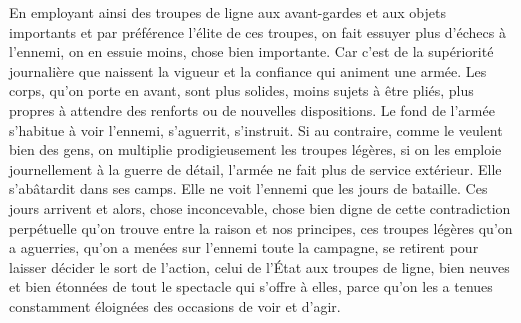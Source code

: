 \documentclass[french,twoside]{book} %
\begin{document}
En employant ainsi des troupes de ligne aux avant-gardes et aux objets importants et par préférence l’élite de ces troupes, on fait essuyer plus d’échecs à l’ennemi, on en essuie moins, chose bien importante. Car c’est de la supériorité journalière que naissent la vigueur et la confiance qui animent une armée. Les corps, qu’on porte en avant, sont plus solides, moins sujets à être pliés, plus propres à attendre des renforts ou de nouvelles dispositions. Le fond de l’armée s’habitue à voir l’ennemi, s’aguerrit, s’instruit. Si au contraire, comme le veulent bien des gens, on multiplie prodigieusement les troupes légères, si on les emploie journellement à la guerre de détail, l’armée ne fait plus de service extérieur. Elle s’abâtardit dans ses camps. Elle ne voit l’ennemi que les jours de bataille. Ces jours arrivent et alors, chose inconcevable, chose bien digne de cette contradiction perpétuelle qu’on trouve entre la raison et nos principes, ces troupes légères qu’on a aguerries, qu’on a menées sur l’ennemi toute la campagne, se retirent pour laisser décider le sort de l’action, celui de l’État aux troupes de ligne, bien neuves et bien étonnées de tout le spectacle qui s’offre à elles, parce qu’on les a tenues constamment éloignées des occasions de voir et d’agir.
\end{document}
